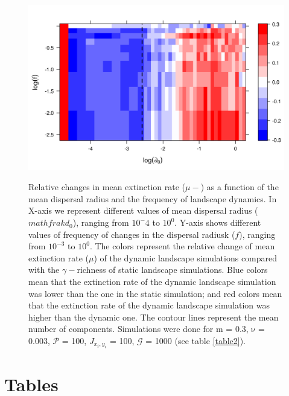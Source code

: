 \documentclass[a4paper,12pt]{article}
\begin{document}
\begin{figure}[hb!]
\begin{center}
\includegraphics[width=\textwidth]{newfigures/relativelevelplot_extrate.png}
\label{fig:phasespace_ext}
\caption{
Relative changes in mean extinction rate ($\mu-$) as a function of the mean dispersal radius and the frequency of landscape dynamics. In X-axis we represent different values of mean dispersal radius ($mathfrak{d_{0}}$), ranging from $10^-4$ to $10^0$. Y-axis shows different values of frequency of changes in the dispersal radiusk ($f$), ranging from $10^{-3}$ to $10^0$. The colors represent the relative change of mean extinction rate ($\mu$) of the dynamic landscape simulations compared with the $\gamma-$richness of static landscape simulations. Blue colors mean that the extinction rate of the dynamic landscape simulation was lower than the one in the static simulation; and red colors mean that the extinction rate of the dynamic landscape simulation was higher than the dynamic one. The contour lines represent the mean number of components. Simulations were done for $\mathrm{m}$ = 0.3, $\mathrm{\nu}$ = 0.003, $\mathcal{P}$ = 100, $J_{x_i,y_i}$ = 100, $\mathcal{G}$ = 1000 (see table \ref{table2}).
}
\end{center}
\end{figure}
\clearpage
\newpage

\section*{Tables}
\end{document}
